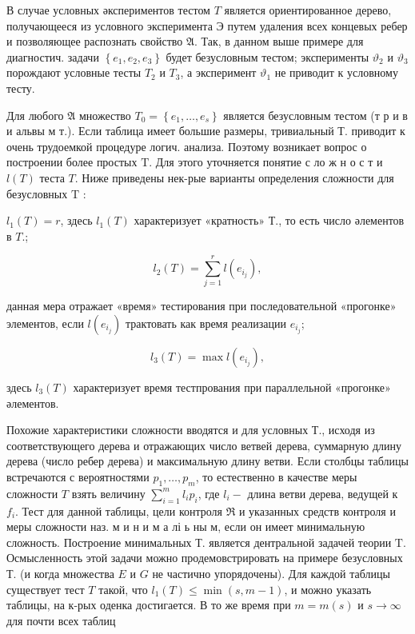 \documentclass[10pt]{article}
\begin{document}
В случае условных әкспериментов тестом $T$ является ориентированное дерево, получающееся из условного эксперимента $Э$ путем удаления всех концевых ребер и позволяющее распознать свойство $\mathfrak{A}$. Так, в данном выше примере для диагностич. задачи $\left\{e_{1}, e_{2}, e_{3}\right\}$ будет безусловным тестом; эксперименты $\vartheta_{2}$ и $\vartheta_{3}$ порождают условные тесты $T_{2}$ и $T_{3}$, а эксперимент $\vartheta_{1}$ не приводит к условному тесту.



Для любого $\mathfrak{A}$ множество $T_{0}=\left\{e_{1}, \ldots, e_{s}\right\}$ является безусловным тестом (т р и в и альвы м т.). Если таблица имеет большие размеры, тривиальный Т. приводит к очень трудоемкой процедуре логич. анализа. Поэтому возникает вопрос о построении более простых $\mathrm{T}$. Для этого уточняется понятие с ло ж н о с т и $l(T)$ теста $T$. Ниже приведены нек-рые варианты определения сложности для безусловных $\mathrm{T}$ :



$l_{1}(T)=r$, здесь $l_{1}(T)$ характеризует «кратность» Т., то есть число әлементов в $T$.;



\[

l_{2}(T)=\sum_{j=1}^{r} l\left(e_{i_{j}}\right),

\]



данная мера отражает «время» тестирования при последовательной «прогонке» элементов, если $l\left(e_{i_{j}}\right)$ трактовать как время реализации $e_{i_{j}}$;



\[

l_{3}(T)=\max l\left(e_{i_{j}}\right),

\]



здесь $l_{3}(T)$ характеризует время тестпрования при параллельной «прогонке» әлементов.



Похожие характеристики сложности вводятся и для условных Т., исходя из соответствующего дерева и отражающих число ветвей дерева, суммарную длину дерева (число ребер дерева) и максимальную длину ветви. Если столбцы таблицы встречаются с вероятностями $p_{1}, \ldots, p_{m}$, то естественно в качестве меры сложности $T$ взять величину $\sum_{i=1}^{m} l_{i} p_{i}$, где $l_{i}-$ длина ветви дерева, ведущей к $f_{i}$. Тест для данной таблицы, цели контроля $\mathfrak{R}$ и указанных средств контроля и меры сложности наз. м и н и м а лі ь ны м, если он имеет минимальную сложность. Построение минимальных Т. является дентральной задачей теории $\mathrm{T}$. Осмысленность этой задачи можно продемовстрировать на примере безусловных Т. (и когда множества $E$ и $G$ не частично упорядочены). Для каждой таблицы существует тест $T$ такой, что $l_{1}(T) \leqslant \min (s, m-1)$, и можно указать таблицы, на к-рых оденка достигается. В то же время при $m=m(s)$ и $s \rightarrow \infty$ для почти всех таблиц
\end{document}

